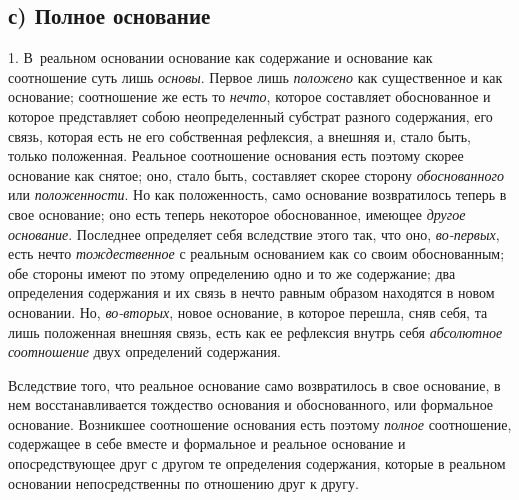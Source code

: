 \subsection[с) Полное основание]{с) Полное основание}

1. В~реальном основании основание как содержание
и основание как соотношение суть лишь {\em основы}.
Первое лишь {\em положено} как существенное и как
основание; соотношение же есть то {\em нечто}, которое
составляет обоснованное и которое представляет собою неопределенный
субстрат разного содержания, его связь, которая есть не его собственная
рефлексия, а внешняя и, стало быть, только положенная. Реальное соотношение
основания есть поэтому скорее основание как снятое; оно, стало быть,
составляет скорее сторону {\em обоснованного} или
{\em положенности}. Но как положенность, само основание
возвратилось теперь в свое основание; оно есть теперь некоторое
обоснованное, имеющее {\em другое основание}. Последнее
определяет себя вследствие этого так, что оно,
{\em во-первых}, есть нечто
{\em тождественное} с реальным основанием как со своим
обоснованным; обе стороны имеют по этому определению одно и то же
содержание; два определения содержания и их связь в нечто равным образом
находятся в новом основании. Но, {\em во-вторых}, новое
основание, в которое перешла, сняв себя, та лишь положенная внешняя связь,
есть как ее рефлексия внутрь себя {\em абсолютное
соотношение} двух определений содержания.

Вследствие того, что реальное основание само возвратилось в свое основание,
в нем восстанавливается тождество основания и обоснованного, или формальное
основание. Возникшее соотношение основания есть поэтому
{\em полное} соотношение, содержащее в себе вместе и
формальное и реальное основание и опосредствующее друг с другом те
определения содержания, которые в реальном основании непосредственны по
отношению друг к другу.

